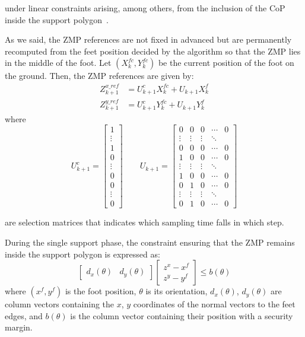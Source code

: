 under linear constraints arising, among others, from the inclusion of the CoP inside the support polygon~\cite{HerdtAR2010}.

As we said, the ZMP references are not fixed in advanced but are permanently recomputed from the feet position decided by the algorithm so that the ZMP lies in the middle of the foot. Let $(X_k^{fc},Y_k^{fc})$ be the current position of the foot on the ground. Then, the ZMP references are given by:
\begin{align}
  Z^{x\_ref}_{k+1} & = U^{c}_{k+1} X_k^{fc} + U_{k+1} X_k^f \\
  Z^{y\_ref}_{k+1} & = U^{c}_{k+1} Y_k^{fc} + U_{k+1} Y_k^f 
\end{align}
where
\begin{equation*}
   U^c_{k+1} = \begin{bmatrix}1 \\ \vdots \\ 1 \\ 0 \\ \vdots \\ 0 \\ 0 \\ \vdots \\ 0  \end{bmatrix} \qquad
   U_{k+1} = \begin{bmatrix} 0 & 0 & 0 & \cdots & 0 \\ \vdots & \vdots
     & \vdots & \ddots\\ 
                                           0 & 0 & 0 & \cdots & 0\\
                           1 & 0 & 0 & \cdots & 0 \\ \vdots & \vdots &
                           \vdots &
                           \ddots \\ 1 & 0 & 0 &\cdots &0\\
                           0 & 1 & 0 & \cdots & 0\\ \vdots & \vdots &
                           \vdots & \ddots \\ 0 & 1 & 0 & \cdots &0\end{bmatrix}
\end{equation*}

are selection matrices that indicates which sampling time falls in which step.

During the single support phase, the constraint ensuring that the ZMP remains inside the support polygon is expressed as:
\begin{equation}
  \begin{bmatrix} d_x(\theta) & d_y(\theta) \end{bmatrix}
  \begin{bmatrix} z^x - x^f \\ z^y - y^f \end{bmatrix} \leq b(\theta)
\end{equation}
where $(x^f,y^f)$ is the foot position, $\theta$ is its orientation,
$d_x(\theta)$, $d_y(\theta)$ are column vectors containing the $x$,
$y$ coordinates of the normal vectors to the feet edges, and $b(\theta)$  is the column vector containing their position with a security margin.
